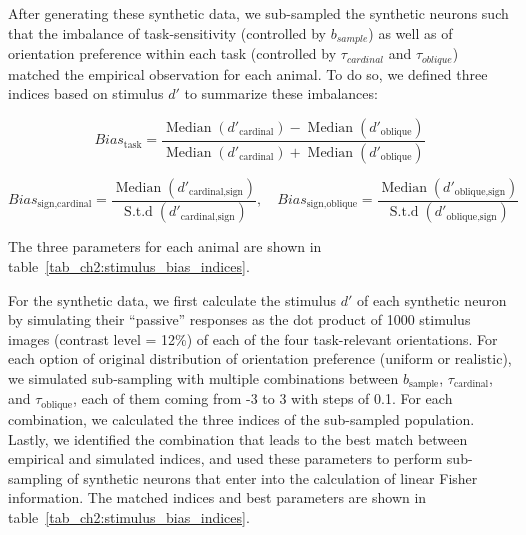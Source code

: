 \documentclass[lineno,pdflatex,sn-basic]{sn-jnl}%
\theoremstyle{thmstyleone}%
\theoremstyle{thmstyletwo}%
\theoremstyle{thmstylethree}%
\begin{document}
After generating these synthetic data, we sub-sampled the synthetic neurons such that the imbalance of task-sensitivity (controlled by $b_{sample}$) as well as of orientation preference within each task (controlled by $\tau_{cardinal}$ and $\tau_{oblique}$) matched the empirical observation for each animal. To do so, we defined three indices based on stimulus $d'$ to summarize these imbalances:

\[Bias_\textrm{task} = \frac{\operatorname{Median}(d'_\textrm{cardinal}) - \operatorname{Median}(d'_\textrm{oblique})}{\operatorname{Median}(d'_\textrm{cardinal}) + \operatorname{Median}(d'_\textrm{oblique})} \]

\[Bias_\textrm{sign,cardinal} = \frac{\operatorname{Median}(d'_\textrm{cardinal,sign})}{\operatorname{S.t.d}(d'_\textrm{cardinal,sign})} , \quad Bias_\textrm{sign,oblique} = \frac{\operatorname{Median}(d'_\textrm{oblique,sign})}{\operatorname{S.t.d}(d'_\textrm{oblique,sign})} \]

The three parameters for each animal are shown in table~\ref {tab_ch2:stimulus_bias_indices}. 

For the synthetic data, we first calculate the stimulus $d'$ of each synthetic neuron by simulating their ``passive'' responses as the dot product of 1000 stimulus images (contrast level = 12\%) of each of the four task-relevant orientations. For each option of original distribution of orientation preference (uniform or realistic), we simulated sub-sampling with multiple combinations between $b_\textrm{sample}$, $\tau_\textrm{cardinal}$, and $\tau_\textrm{oblique}$, each of them coming from -3 to 3 with steps of 0.1. For each combination, we calculated the three indices of the sub-sampled population. Lastly, we identified the combination that leads to the best match between empirical and simulated indices, and used these parameters to perform sub-sampling of synthetic neurons that enter into the calculation of linear Fisher information. The matched indices and best parameters are shown in table~\ref {tab_ch2:stimulus_bias_indices}.
\end{document}
